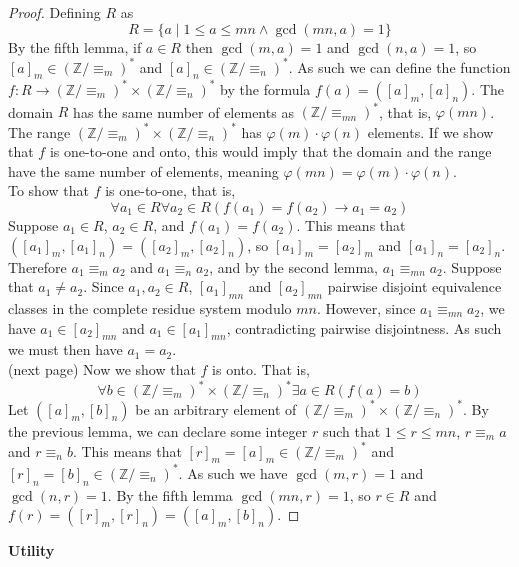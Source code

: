 \documentclass{report}
\theoremstyle{definition}
\begin{document}
\begin{proof}
Defining $R$ as
\begin{equation*}
R=\{a\mid1\leq a\leq mn\land\gcd(mn,a)=1\}
\end{equation*}
By the fifth lemma, if $a\in R$ then $\gcd(m,a)=1$ and $\gcd(n,a)=1$, so
$[a]_m\in(\mathbb Z/\equiv_m)^*$ and $[a]_n\in(\mathbb Z/\equiv_n)^*$.
As such we can define the function $f:R\to(\mathbb Z/\equiv_m)^*\times(\mathbb Z/\equiv_n)^*$ by the formula 
$f(a)=([a]_m,[a]_n)$. The domain $R$ has the same number of elements as $(\mathbb Z/\equiv_{mn})^*$, that is, $\varphi(mn)$. 
The range $(\mathbb Z/\equiv_m)^*\times(\mathbb Z/\equiv_n)^*$ has $\varphi(m)\cdot\varphi(n)$ elements. If we show that $f$ is one-to-one and onto,
this would imply that the domain and the range have the same number of elements, meaning $\varphi(mn)=\varphi(m)\cdot\varphi(n)$.\\
\indent To show that $f$ is one-to-one, that is,
\begin{equation*}
\forall a_1\in R\forall a_2\in R(f(a_1)=f(a_2)\to a_1=a_2)
\end{equation*}
Suppose $a_1\in R$, $a_2\in R$, and $f(a_1)=f(a_2)$. This means that 
$([a_1]_m,[a_1]_n)=([a_2]_m,[a_2]_n)$, so $[a_1]_m=[a_2]_m$ and $[a_1]_n=[a_2]_n$. Therefore $a_1\equiv_m a_2$ and $a_1\equiv_n a_2$, and by the 
second lemma, $a_1\equiv_{mn}a_2$.
Suppose that $a_1\neq a_2$. Since $a_1,a_2\in R$, $[a_1]_{mn}$ and $[a_2]_{mn}$ pairwise disjoint equivalence classes 
in the complete residue system modulo
$mn$. However, since $a_1\equiv_{mn}a_2$, we have $a_1\in[a_2]_{mn}$ 
and $a_1\in[a_1]_{mn}$, contradicting pairwise disjointness. As such we must then have $a_1=a_2$.\\
(next page)\newpage
\indent Now we show that $f$ is onto. That is,
\begin{equation*}
\forall b\in(\mathbb Z/\equiv_m)^*\times(\mathbb Z/\equiv_n)^*\exists a\in R(f(a)=b)
\end{equation*}
Let $([a]_m,[b]_n)$ be an arbitrary element of $(\mathbb Z/\equiv_m)^*\times(\mathbb Z/\equiv_n)^*$. By the previous lemma, we can declare some
integer $r$ such that $1\leq r\leq mn$, $r\equiv_ma$ and $r\equiv_nb$.
This means that $[r]_m=[a]_m\in(\mathbb Z/\equiv_m)^*$ and $[r]_n=[b]_n\in(\mathbb Z/\equiv_n)^*$. As such we have $\gcd(m,r)=1$ and $\gcd(n,r)=1$.
By the fifth lemma $\gcd(mn,r)=1$, so $r\in R$ and $f(r)=([r]_m,[r]_n)=([a]_m,[b]_n)$.
\end{proof}
\noindent\textbf{Utility}\\
\end{document}
